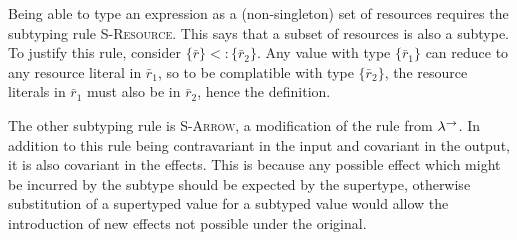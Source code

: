 Being able to type an expression as a (non-singleton) set of resources requires the subtyping rule \textsc{S-Resource}. This says that a subset of resources is also a subtype. To justify this rule, consider $\{ \bar r \} <: \{ \bar r_2 \}$. Any value with type $\{ \bar r_1 \}$ can reduce to any resource literal in $\bar r_1$, so to be complatible with type $\{ \bar r_2 \}$, the resource literals in $\bar r_1$ must also be in $\bar r_2$, hence the definition.

The other subtyping rule is \textsc{S-Arrow}, a modification of the rule from $\lambda^{\rightarrow}$. In addition to this rule being contravariant in the input and covariant in the output, it is also covariant in the effects. This is because any possible effect which might be incurred by the subtype should be expected by the supertype, otherwise substitution of a supertyped value for a subtyped value would allow the introduction of new effects not possible under the original.\\

